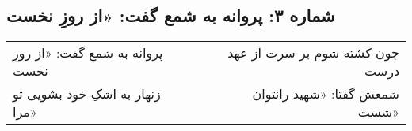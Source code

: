 \begin{center}
\section*{شماره ۳: پروانه به شمع گفت: «از روزِ نخست}
\label{sec:003}
\begin{longtable}{l p{0.5cm} r}
پروانه به شمع گفت: «از روزِ نخست
&&
چون کشته شوم بر سرت از عهد درست
\\
زنهار به اشکِ خود بشویی تو مرا»
&&
شمعش گفتا: «شهید رانتوان شست»
\\
\end{longtable}
\end{center}

